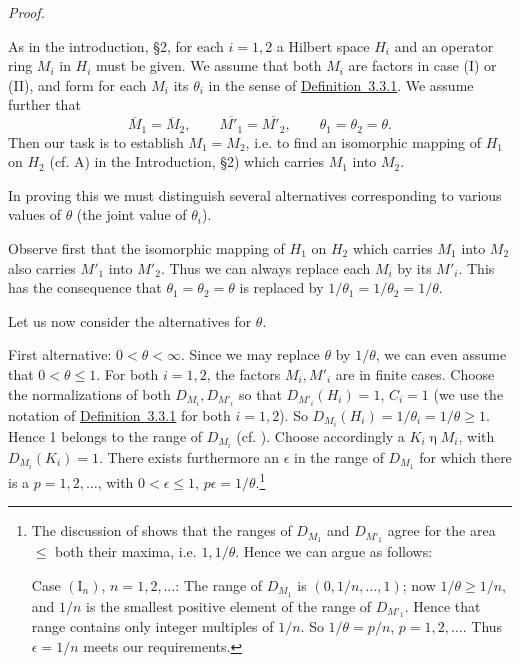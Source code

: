 \documentclass[b5paper,twoside]{article}
\newcommand{\defref}[2]{\hyperref[#1]{\mbox{Definition~#2}}}
\theoremstyle{mvnplain}
\renewenvironment{proof}[1][Proof]{%
  \par\addvspace{0.35\baselineskip}%
  \noindent\textit{#1.}\ \normalfont\ignorespaces
}{%
  \par\addvspace{0.35\baselineskip}%
}
\newcommand{\M}{\mathbf M}
\newcommand{\Hilbert}{\mathfrak H}
\def\M{M}%
\def\Hilbert{H}%
\def\widetilde#1{#1}%
\def\mathfrak#1{#1}%
\begin{document}
\begin{proof}
As in the introduction, \S2, for each \(i=1,2\) a Hilbert space
\(\Hilbert_i\) and an operator ring \(\M_i\) in \(\Hilbert_i\) must be given.
We assume that both \(\M_i\) are factors in case (I) or (II), and form for each
\(\M_i\) its \(\theta_i\) in the sense of \defref{def:3.3.1}{3.3.1}. We
assume further that
\[
  \overline{\M}_1=\overline{\M}_2,\qquad
 \overline{\M'_1}=\overline{\M'_2},\qquad
  \theta_1=\theta_2=\theta.
\]
Then our task is to establish \(\widetilde{\M}_1=\widetilde{\M}_2\), i.e. to
find an isomorphic mapping of \(\Hilbert_1\) on \(\Hilbert_2\) (cf. A) in the
Introduction, \S2) which carries \(\M_1\) into \(\M_2\).

In proving this we must distinguish several alternatives corresponding to
various values of \(\theta\) (the joint value of \(\theta_i\)).

Observe first that the isomorphic mapping of \(\Hilbert_1\) on
\(\Hilbert_2\) which carries \(\M_1\) into \(\M_2\) also carries
\(\M'_1\) into \(\M'_2\). Thus we can always replace each \(\M_i\) by its
\(\M'_i\). This has the consequence that
\(\theta_1=\theta_2=\theta\) is replaced by
\(1/\theta_1=1/\theta_2=1/\theta\).

Let us now consider the alternatives for \(\theta\).

First alternative: \(0<\theta<\infty\). Since we may replace \(\theta\) by
\(1/\theta\), we can even assume that \(0<\theta\leq1\). For both
\(i=1,2\), the factors \(\M_i,\M'_i\) are in finite cases. Choose the
normalizations of both \(D_{\M_i},D_{\M'_i}\) so that
\(D_{\M'_i}(\Hilbert_i)=1\), \(C_i=1\) (we use the notation of
\defref{def:3.3.1}{3.3.1} for both \(i=1,2\)). So
\(D_{\M_i}(\Hilbert_i)=1/\theta_i=1/\theta\geq1\). Hence 1 belongs to the
range of \(D_{\M_i}\) (cf. \cite[p.~182, the discussion of the ranges of
\(\Delta,\Delta_0,\Delta',\Delta'_0\) in Theorem~X and preceding it]{ref5}).
Choose accordingly a \(\mathfrak K_i\mathrel{\eta}\M_i\), with
\(D_{\M_i}(\mathfrak K_i)=1\). There exists furthermore an \(\epsilon\) in
the range of \(D_{\M_1}\) for which there is a \(p=1,2,\ldots\), with
\(0<\epsilon\leq1\), \(p\epsilon=1/\theta\).\footnote{The discussion of
\cite[p.~182]{ref5} shows that the ranges of \(D_{\M_1}\) and
\(D_{\M'_1}\) agree for the area \(\leq\) both their maxima, i.e.
\(1,1/\theta\). Hence we can argue as follows:

Case \((\mathrm I_n)\), \(n=1,2,\ldots\): The range of \(D_{\M_1}\) is
\((0,1/n,\ldots,1)\); now \(1/\theta\geq1/n\), and \(1/n\) is the smallest
positive element of the range of \(D_{\M'_1}\). Hence that range contains only
integer multiples of \(1/n\). So \(1/\theta=p/n\), \(p=1,2,\ldots\). Thus
\(\epsilon=1/n\) meets our requirements.

}
\end{proof}
\end{document}
